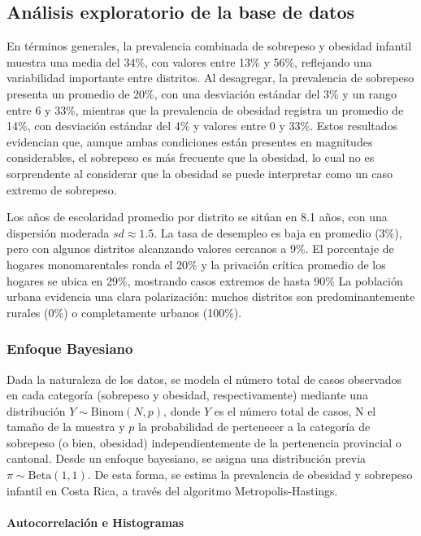\documentclass[
]{article}
\begin{document}
\subsection{Análisis exploratorio de la base de
datos}\label{anuxe1lisis-exploratorio-de-la-base-de-datos}

En términos generales, la prevalencia combinada de sobrepeso y obesidad
infantil muestra una media del 34\%, con valores entre 13\% y 56\%,
reflejando una variabilidad importante entre distritos. Al desagregar,
la prevalencia de sobrepeso presenta un promedio de 20\%, con una
desviación estándar del 3\% y un rango entre 6 y 33\%, mientras que la
prevalencia de obesidad registra un promedio de 14\%, con desviación
estándar del 4\% y valores entre 0 y 33\%. Estos resultados evidencian
que, aunque ambas condiciones están presentes en magnitudes
considerables, el sobrepeso es más frecuente que la obesidad, lo cual no
es sorprendente al considerar que la obesidad se puede interpretar como
un caso extremo de sobrepeso.

Los años de escolaridad promedio por distrito se sitúan en 8.1 años, con
una dispersión moderada \(sd \approx 1.5\). La tasa de desempleo es baja
en promedio (3\%), pero con algunos distritos alcanzando valores
cercanos a 9\%. El porcentaje de hogares monomarentales ronda el 20\% y
la privación crítica promedio de los hogares se ubica en 29\%, mostrando
casos extremos de hasta 90\% La población urbana evidencia una clara
polarización: muchos distritos son predominantemente rurales (0\%) o
completamente urbanos (100\%).

\subsubsection{Enfoque Bayesiano}\label{enfoque-bayesiano}

Dada la naturaleza de los datos, se modela el número total de casos
observados en cada categoría (sobrepeso y obesidad, respectivamente)
mediante una distribución \(Y \sim \text{Binom}(N,p)\), donde \(Y\) es
el número total de casos, N el tamaño de la muestra y \(p\) la
probabilidad de pertenecer a la categoría de sobrepeso (o bien,
obesidad) independientemente de la pertenencia provincial o cantonal.
Desde un enfoque bayesiano, se asigna una distribución previa
\(\pi \sim \text{Beta}(1,1)\). De esta forma, se estima la prevalencia
de obesidad y sobrepeso infantil en Costa Rica, a través del algoritmo
Metropolis-Hastings.

\paragraph{Autocorrelación e
Histogramas}\label{autocorrelaciuxf3n-e-histogramas}
\end{document}
